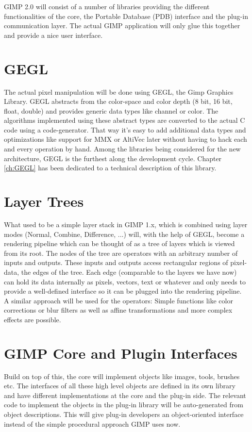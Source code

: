 GIMP 2.0 will consist of a number of libraries providing the different
functionalities of the core, the Portable Database (PDB) interface and
the plug-in communication layer. The actual GIMP application will only
glue this together and provide a nice user interface.

\section{GEGL}

The actual pixel manipulation will be done using GEGL, the Gimp
Graphics Library. GEGL abstracts from the color-space and color depth
(8 bit, 16 bit, float, double) and provides generic data types like
channel or color. The algorithms implemented using these abstract
types are converted to the actual C code using a code-generator. That
way it's easy to add additional data types and optimizations like
support for MMX or AltiVec later without having to hack each and every
operation by hand. Among the libraries being considered for the new
architecture, GEGL is the furthest along the development cycle.
Chapter \ref{ch:GEGL} has been dedicated to a technical description
of this library.

\section{Layer Trees}
 
What used to be a simple layer stack in GIMP 1.x, which is combined
using layer modes (Normal, Combine, Difference, ...) will, with the
help of GEGL, become a rendering pipeline which can be thought of as a
tree of layers which is viewed from its root. The nodes of the tree
are operators with an arbitrary number of inputs and outputs. These
inputs and outputs access rectangular regions of pixel-data, the edges
of the tree. Each edge (comparable to the layers we have now) can hold
its data internally as pixels, vectors, text or whatever and only
needs to provide a well-defined interface so it can be plugged into
the rendering pipeline. A similar approach will be used for the
operators: Simple functions like color corrections or blur filters as
well as affine transformations and more complex effects are possible.

\section{GIMP Core and Plugin Interfaces}

Build on top of this, the core will implement objects like images,
tools, brushes etc. The interfaces of all these high level objects are
defined in its own library and have different implementations at the
core and the plug-in side. The relevant code to implement the objects
in the plug-in library will be auto-generated from object
descriptions. This will give plug-in developers an object-oriented
interface instead of the simple procedural approach GIMP uses now.


